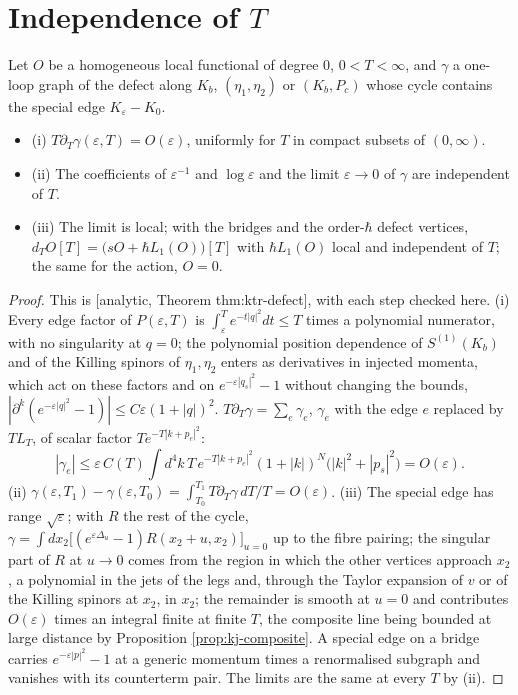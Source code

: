 \section{Independence of $T$}

\begin{theorem}
\label{thm:kj-Tindep}
Let $O$ be a homogeneous local functional of degree $0$, $0<T<\infty$, and $\gamma$ a one-loop graph of the defect along $K_b$, $(\eta_1,\eta_2)$ or $(K_b,P_c)$ whose cycle contains the special edge $K_\varepsilon-K_0$.
\begin{itemize}
\item (i) $T\partial_T\gamma(\varepsilon,T)=O(\varepsilon)$, uniformly for $T$ in compact subsets of $(0,\infty)$.
\item (ii) The coefficients of $\varepsilon^{-1}$ and $\log\varepsilon$ and the limit $\varepsilon\to0$ of $\gamma$ are independent of $T$.
\item (iii) The limit is local; with the bridges and the order-$\hbar$ defect vertices, $d_TO[T]=\big(sO+\hbar L_1(O)\big)[T]$ with $\hbar L_1(O)$ local and independent of $T$; the same for the action, $O=0$.
\end{itemize}
\end{theorem}

\begin{proof}
This is [analytic, Theorem thm:ktr-defect], with each step checked here. (i) Every edge factor of $P(\varepsilon,T)$ is $\int_\varepsilon^Te^{-t|q|^2}dt\le T$ times a polynomial numerator, with no singularity at $q=0$; the polynomial position dependence of $S^{(1)}(K_b)$ and of the Killing spinors of $\eta_1,\eta_2$ enters as derivatives in injected momenta, which act on these factors and on $e^{-\varepsilon|q_s|^2}-1$ without changing the bounds, $|\partial^k(e^{-\varepsilon|q|^2}-1)|\le C\varepsilon(1+|q|)^{2}$. $T\partial_T\gamma=\sum_e\gamma_e$, $\gamma_e$ with the edge $e$ replaced by $TL_T$, of scalar factor $Te^{-T|k+p_e|^2}$:
\[
|\gamma_e|\le\varepsilon\,C(T)\int d^4k\,T\,e^{-T|k+p_e|^2}(1+|k|)^N\big(|k|^2+|p_s|^2\big)=O(\varepsilon).
\]
(ii) $\gamma(\varepsilon,T_1)-\gamma(\varepsilon,T_0)=\int_{T_0}^{T_1}T\partial_T\gamma\,dT/T=O(\varepsilon)$. (iii) The special edge has range $\sqrt\varepsilon$; with $R$ the rest of the cycle, $\gamma=\int dx_2\big[(e^{\varepsilon\Delta_u}-1)R(x_2+u,x_2)\big]_{u=0}$ up to the fibre pairing; the singular part of $R$ at $u\to0$ comes from the region in which the other vertices approach $x_2$, a polynomial in the jets of the legs and, through the Taylor expansion of $v$ or of the Killing spinors at $x_2$, in $x_2$; the remainder is smooth at $u=0$ and contributes $O(\varepsilon)$ times an integral finite at finite $T$, the composite line being bounded at large distance by Proposition \ref{prop:kj-composite}. A special edge on a bridge carries $e^{-\varepsilon|p|^2}-1$ at a generic momentum times a renormalised subgraph and vanishes with its counterterm pair. The limits are the same at every $T$ by (ii).
\end{proof}

